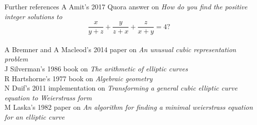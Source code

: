 \documentclass[8pt,t]{beamer}
\begin{document}
\begin{frame}{Further references}
A Amit's 2017 Quora answer on \textit{How do you find the positive integer solutions to}
$$ \dfrac{x}{y + z} + \dfrac{y}{z + x} + \dfrac{z}{x + y} = 4? $$ \vspace{0.4cm} \\
A Bremner and A Macleod's 2014 paper on \textit{An unusual cubic representation problem} \vspace{1cm} \\
J Silverman's 1986 book on \textit{The arithmetic of elliptic curves} \vspace{1cm} \\
R Hartshorne's 1977 book on \textit{Algebraic geometry} \vspace{1cm} \\
N Duif's 2011 implementation on \textit{Transforming a general cubic elliptic curve equation to Weierstrass form} \vspace{0.7cm} \\
M Laska's 1982 paper on \emph{An algorithm for finding a minimal weierstrass equation for an elliptic curve}
\end{frame}
\end{document}
